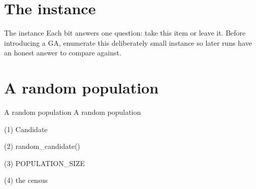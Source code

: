\section{The instance}

\begin{frame}{The instance}
Each bit answers one question: take this item or leave it. Before introducing a
GA, enumerate this deliberately small instance so later runs have an honest
answer to compare against.
\end{frame}


\section{A random population}

\begin{frame}{A random population}
A random population
\end{frame}

\begin{frame}[fragile]{(1) Candidate}

\end{frame}

\begin{frame}[fragile]{(2) random\_candidate()}

\end{frame}

\begin{frame}[fragile]{(3) POPULATION\_SIZE}

\end{frame}

\begin{frame}[fragile]{(4) the census}

\end{frame}


